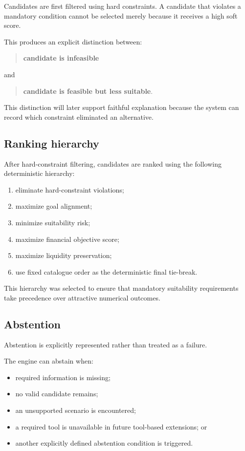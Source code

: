 \documentclass[12pt,a4paper]{article}
\begin{document}
Candidates are first filtered using hard constraints. A candidate that violates a mandatory condition cannot be selected merely because it receives a high soft score.

This produces an explicit distinction between:
\begin{quote}
\textbf{candidate is infeasible}
\end{quote}
and
\begin{quote}
\textbf{candidate is feasible but less suitable}.
\end{quote}

This distinction will later support faithful explanation because the system can record which constraint eliminated an alternative.

\subsection{Ranking hierarchy}

After hard-constraint filtering, candidates are ranked using the following deterministic hierarchy:

\begin{enumerate}
    \item eliminate hard-constraint violations;
    \item maximize goal alignment;
    \item minimize suitability risk;
    \item maximize financial objective score;
    \item maximize liquidity preservation;
    \item use fixed catalogue order as the deterministic final tie-break.
\end{enumerate}

This hierarchy was selected to ensure that mandatory suitability requirements take precedence over attractive numerical outcomes.

\subsection{Abstention}

Abstention is explicitly represented rather than treated as a failure.

The engine can abstain when:
\begin{itemize}
    \item required information is missing;
    \item no valid candidate remains;
    \item an unsupported scenario is encountered;
    \item a required tool is unavailable in future tool-based extensions; or
    \item another explicitly defined abstention condition is triggered.
\end{itemize}
\end{document}
